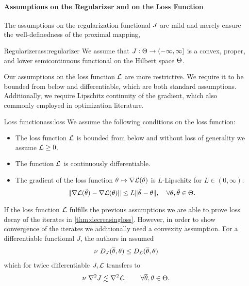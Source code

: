 \paragraph{Assumptions on the Regularizer and on the Loss Function}
%
The assumptions on the regularization functional $J$ are mild and merely ensure the well-definedness of the proximal mapping,
%
%
\begin{assumption}{Regularizer}{ass:regularizer}
We assume that $J:\Theta\to(-\infty,\infty]$ is a convex, proper, and lower semicontinuous functional on the Hilbert space $\Theta$.
\end{assumption}
%
%
Our assumptions on the loss function $\mathcal{L}$ are more restrictive. We require it to be bounded from below and differentiable, which are both standard assumptions. Additionally, we require Lipschitz continuity of the gradient, which also commonly employed in optimization literature.
%
\begin{assumption}{Loss function}{ass:loss}
We assume the following conditions on the loss function:
\begin{itemize}
    \item The loss function $\mathcal{L}$ is bounded from below and without loss of generality we assume $\mathcal{L}\geq 0$.
    \item The function $\mathcal{L}$ is continuously differentiable.
    \item The gradient of the loss function $\theta\mapsto\nabla\mathcal{L}(\theta)$ is $L$-Lipschitz for $L\in(0,\infty)$:
    \begin{align}\label{ineq:gradLip}
        \|\nabla\mathcal{L}(\tilde{\theta})-\nabla\mathcal{L}(\theta)\|\leq L \|\tilde{\theta}-\theta\|,\quad \forall \theta,\tilde{\theta}\in\Theta.
    \end{align}
\end{itemize}
\end{assumption}
%
%
If the loss function $\mathcal{L}$ fulfills the previous assumptions we are able to prove loss decay of the iterates in \cref{thm:decreasingloss}. However, in order to show convergence of the iterates we additionally need a convexity assumption. For a differentiable functional $J$, the authors in \cite{dragomir2021fast} assumed
%
\begin{align*}
\nu\ D_J(\overline\theta,\theta) \leq D_{\mathcal{L}}(\overline\theta,\theta)
\end{align*}
%
which for twice differentiable $J,\mathcal{L}$ transfers to
%
\begin{align*}
\nu\ \nabla^2 J \lesssim \nabla^2 \mathcal{L},\qquad\forall\overline\theta,\theta\in\Theta.
\end{align*}

